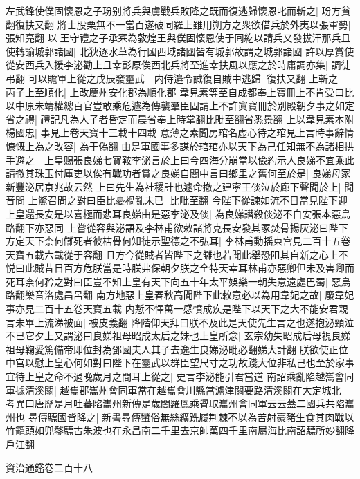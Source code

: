 左武鋒使僕固懷恩之子玢别將兵與虜戰兵敗降之既而復逃歸懷恩叱而斬之|{
	玢方貧翻復扶又翻}
將士股栗無不一當百遂破同羅上雖用朔方之衆欲借兵於外夷以張軍勢|{
	張知亮翻}
以王守禮之子承宷為敦煌王與僕固懷恩使于囘紇以請兵又發拔汗那兵且使轉諭城郭諸國|{
	北狄逐水草為行國西域諸國皆有城郭故謂之城郭諸國}
許以厚賞使從安西兵入援李泌勸上且幸彭原俟西北兵將至進幸扶風以應之於時庸調亦集|{
	調徒弔翻}
可以贍軍上從之戊辰發靈武　内侍邉令誠復自賊中逃歸|{
	復扶又翻}
上斬之　丙子上至順化|{
	上改慶州安化郡為順化郡}
韋見素等至自成都奉上寶冊上不肯受曰比以中原未靖權總百官豈敢乘危遽為傳襲羣臣固請上不許寘寶冊於别殿朝夕事之如定省之禮|{
	禮記凡為人子者昏定而晨省奉上時掌翻比毗至翻省悉景翻}
上以韋見素本附楊國忠|{
	事見上卷天寶十三載十四載}
意薄之素聞房琯名虚心待之琯見上言時事辭情慷慨上為之改容|{
	為于偽翻}
由是軍國事多謀於琯琯亦以天下為己任知無不為諸相拱手避之　上皇賜張良娣七寶鞍李泌言於上曰今四海分崩當以儉約示人良娣不宜乘此請撤其珠玉付庫吏以俟有戰功者賞之良娣自閤中言曰鄉里之舊何至於是|{
	良娣母家新豐泌居京兆故云然}
上曰先生為社稷計也遽命撤之建寜王倓泣於廊下聲聞於上|{
	聞音問}
上驚召問之對曰臣比憂禍亂未已|{
	比毗至翻}
今陛下從諫如流不日當見陛下迎上皇還長安是以喜極而悲耳良娣由是惡李泌及倓|{
	為良娣譖殺倓泌不自安張本惡烏路翻下亦惡同}
上嘗從容與泌語及李林甫欲敕諸將克長安發其冢焚骨揚灰泌曰陛下方定天下柰何讎死者彼枯骨何知徒示聖德之不弘耳|{
	李林甫動揺東宫見二百十五卷天寶五載六載從于容翻}
且方今從賊者皆陛下之讎也若聞此舉恐阻其自新之心上不悦曰此賊昔日百方危朕當是時朕弗保朝夕朕之全特天幸耳林甫亦惡卿但未及害卿而死耳柰何矜之對曰臣豈不知上皇有天下向五十年太平娛樂一朝失意遠處巴蜀|{
	惡烏路翻樂音洛處昌呂翻}
南方地惡上皇春秋高聞陛下此敕意必以為用韋妃之故|{
	廢韋妃事亦見二百十五卷天寶五載}
内慙不懌萬一感憤成疾是陛下以天下之大不能安君親言未畢上流涕被面|{
	被皮義翻}
降階仰天拜曰朕不及此是天使先生言之也遂抱泌頸泣不已它夕上又謂泌曰良娣祖母昭成太后之妹也上皇所念|{
	玄宗幼失昭成后母視良娣祖母鞠愛篤備帝即位封為鄧國夫人其子去逸生良娣泌毗必翻娣大計翻}
朕欲使正位中宫以慰上皇心何如對曰陛下在靈武以群臣望尺寸之功故踐大位非私己也至於家事宜待上皇之命不過晚歲月之間耳上從之|{
	史言李泌能引君當道}
南詔乘亂陷越嶲會同軍據清溪關|{
	越巂郡巂州會同軍當在越巂會川縣當瀘津關要路清溪關在大定城北　考異曰唐歷是月吐蕃陷巂州新傳是歲閤羅鳳乘舋取巂州會同軍云云蓋二國兵共陷巂州也}
尋傳驃國皆降之|{
	新書尋傳蠻俗無絲纊跣履荆棘不以為苦射豪豬生食其肉戰以竹籠頭如兜鍪驃古朱波也在永昌南二千里去京師萬四千里南屬海比南詔驃所妙翻降戶江翻}


資治通鑑卷二百十八
